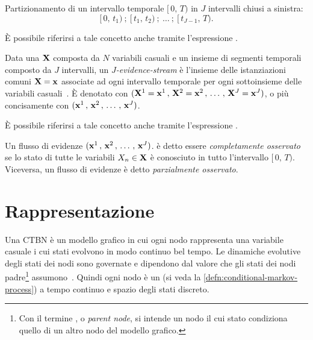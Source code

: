 \begin{definizione}\label{defn:j-time-segment}
Partizionamento di un intervallo temporale $[\,0,\,T)$ in $J$ intervalli chiusi a sinistra:
\[
[\,0,\,t_1)\:;\:[\,t_1,\,t_2)\:;\:\dotsc\:;\:[\,t_{J-1},\,T)\text{.}
\]
\end{definizione}
\begin{notabene}
\`E possibile riferirsi a tale concetto anche tramite l'espressione \emph{}.
\end{notabene}
\begin{definizione}\label{defn:j-evidence-stream}
Data una \pv{} $\mathbf{X}$ composta da $N$ variabili casuali e un insieme di segmenti temporali composto da $J$ intervalli, un \emph{$J$-evidence-stream} è l'insieme delle istanziazioni comuni $\mathbf{X}=\mathbf{x}$ associate ad ogni intervallo temporale per ogni sottoinsieme delle variabili casuali~\citep{Stella2012}. \`E denotato con $(\mathbf{X}^1=\mathbf{x}^1\,,\,\mathbf{X}^2=\mathbf{x}^2\,,\,\dotsc\,,\,\mathbf{X}^J=\mathbf{x}^J)$, o più concisamente con $(\mathbf{x}^1\,,\,\mathbf{x}^2\,,\,\dotsc\,,\,\mathbf{x}^{J})$.
\end{definizione}
\begin{notabene}
\`E possibile riferirsi a tale concetto anche tramite l'espressione \emph{}.
\end{notabene}
\begin{notabene}
Un flusso di evidenze $(\mathbf{x}^1\,,\,\mathbf{x}^2\,,\,\dotsc\,,\,\mathbf{x}^{J})$. è detto essere \emph{completamente osservato} se lo stato di tutte le variabili $\mathnormal{X_n}\in\mathbf{X}$ è conosciuto in tutto l'intervallo $[\,0,\,T)$. Viceversa, un flusso di evidenze è detto \emph{parzialmente osservato}.
\end{notabene}

\section{Rappresentazione}
\label{sec:ctbn-rappresentazione}
Una \acl{CTBN} è un modello grafico in cui ogni nodo rappresenta una variabile casuale i cui stati evolvono in modo continuo bel tempo. Le dinamiche evolutive degli stati dei nodi sono governate e dipendono dal valore che gli stati dei nodi padre\footnote{Con il termine , o \emph{parent node}, si intende un nodo il cui stato condiziona quello di un altro nodo del modello grafico.} assumono~\citep{Nodelman2007}. Quindi ogni nodo è un \mprocess*{} \cond*{} (si veda la \autoref{defn:conditional-markov-process}) a tempo continuo e spazio degli stati discreto.

